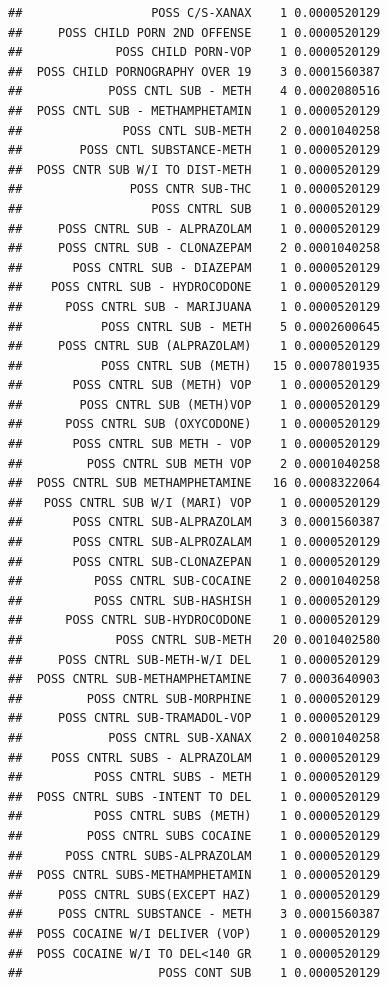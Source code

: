 \documentclass[]{book}
\begin{document}
\begin{verbatim}
##                  POSS C/S-XANAX    1 0.0000520129
##     POSS CHILD PORN 2ND OFFENSE    1 0.0000520129
##             POSS CHILD PORN-VOP    1 0.0000520129
##  POSS CHILD PORNOGRAPHY OVER 19    3 0.0001560387
##            POSS CNTL SUB - METH    4 0.0002080516
##  POSS CNTL SUB - METHAMPHETAMIN    1 0.0000520129
##              POSS CNTL SUB-METH    2 0.0001040258
##        POSS CNTL SUBSTANCE-METH    1 0.0000520129
##  POSS CNTR SUB W/I TO DIST-METH    1 0.0000520129
##               POSS CNTR SUB-THC    1 0.0000520129
##                  POSS CNTRL SUB    1 0.0000520129
##     POSS CNTRL SUB - ALPRAZOLAM    1 0.0000520129
##     POSS CNTRL SUB - CLONAZEPAM    2 0.0001040258
##       POSS CNTRL SUB - DIAZEPAM    1 0.0000520129
##    POSS CNTRL SUB - HYDROCODONE    1 0.0000520129
##      POSS CNTRL SUB - MARIJUANA    1 0.0000520129
##           POSS CNTRL SUB - METH    5 0.0002600645
##     POSS CNTRL SUB (ALPRAZOLAM)    1 0.0000520129
##           POSS CNTRL SUB (METH)   15 0.0007801935
##       POSS CNTRL SUB (METH) VOP    1 0.0000520129
##        POSS CNTRL SUB (METH)VOP    1 0.0000520129
##      POSS CNTRL SUB (OXYCODONE)    1 0.0000520129
##       POSS CNTRL SUB METH - VOP    1 0.0000520129
##         POSS CNTRL SUB METH VOP    2 0.0001040258
##  POSS CNTRL SUB METHAMPHETAMINE   16 0.0008322064
##   POSS CNTRL SUB W/I (MARI) VOP    1 0.0000520129
##       POSS CNTRL SUB-ALPRAZOLAM    3 0.0001560387
##       POSS CNTRL SUB-ALPROZALAM    1 0.0000520129
##       POSS CNTRL SUB-CLONAZEPAN    1 0.0000520129
##          POSS CNTRL SUB-COCAINE    2 0.0001040258
##          POSS CNTRL SUB-HASHISH    1 0.0000520129
##      POSS CNTRL SUB-HYDROCODONE    1 0.0000520129
##             POSS CNTRL SUB-METH   20 0.0010402580
##     POSS CNTRL SUB-METH-W/I DEL    1 0.0000520129
##  POSS CNTRL SUB-METHAMPHETAMINE    7 0.0003640903
##         POSS CNTRL SUB-MORPHINE    1 0.0000520129
##     POSS CNTRL SUB-TRAMADOL-VOP    1 0.0000520129
##            POSS CNTRL SUB-XANAX    2 0.0001040258
##    POSS CNTRL SUBS - ALPRAZOLAM    1 0.0000520129
##          POSS CNTRL SUBS - METH    1 0.0000520129
##  POSS CNTRL SUBS -INTENT TO DEL    1 0.0000520129
##          POSS CNTRL SUBS (METH)    1 0.0000520129
##         POSS CNTRL SUBS COCAINE    1 0.0000520129
##      POSS CNTRL SUBS-ALPRAZOLAM    1 0.0000520129
##  POSS CNTRL SUBS-METHAMPHETAMIN    1 0.0000520129
##     POSS CNTRL SUBS(EXCEPT HAZ)    1 0.0000520129
##     POSS CNTRL SUBSTANCE - METH    3 0.0001560387
##  POSS COCAINE W/I DELIVER (VOP)    1 0.0000520129
##  POSS COCAINE W/I TO DEL<140 GR    1 0.0000520129
##                   POSS CONT SUB    1 0.0000520129

\end{verbatim}
\end{document}
